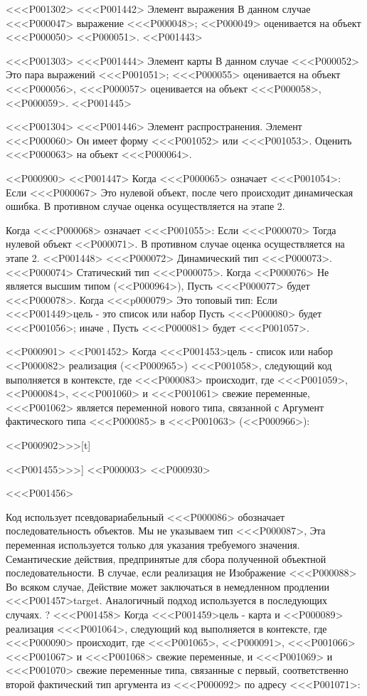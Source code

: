 {{{{{<<<P001302>%
<<<P001442> Элемент выражения
В данном случае <<<P000047> выражение <<<P000048>;
<<P000049> оценивается на объект <<<P000050>
<<P000051>.
<<P001443>

<<<P001303>%
<<<P001444> Элемент карты
В данном случае <<<P000052> Это пара выражений
<<<P001051>;
<<<P000055> оценивается на объект <<<P000056>,
<<<P000057> оценивается на объект <<<P000058>,
<<P000059>.
<<P001445>

<<<P001304>%
<<<P001446> Элемент распространения.
Элемент <<<P000060> Он имеет форму <<<P001052> или <<<P001053>.
Оценить <<<P000063> на объект <<<P000064>.

<<P000900>
<<P001447>
Когда <<<P000065> означает <<<P001054>:
Если <<<P000067> Это нулевой объект, после чего происходит динамическая ошибка.
В противном случае оценка осуществляется на этапе 2.

Когда <<<P000068> означает <<<P001055>:
Если <<<P000070> Тогда нулевой объект
<<P000071>.
В противном случае оценка осуществляется на этапе 2.
<<P001448>
<<<P000072> Динамический тип <<<P000073>.
<<<P000074> Статический тип <<<P000075>.
Когда <<P000076> Не является высшим типом
(<<P000964>),
Пусть <<<P000077> будет <<<P000078>.
Когда <<<p000079> Это топовый тип:
Если <<<P001449>{цель} - это список или набор
Пусть <<<P000080> будет <<<P001056>;
иначе
,
Пусть <<<P000081> будет <<<P001057>.

<<P000901>
<<P001452>
Когда <<<P001453>{цель} - список или набор
<<P000082> реализация
(<<P000965>)
<<<P001058>,
следующий код выполняется в контексте, где <<<P000083> происходит,
где <<<P001059>, <<P000084>, <<<P001060> и <<<P001061> свежие переменные,<<<P001062> является переменной нового типа, связанной с
Аргумент фактического типа <<<P000085> в <<<P001063>
(<<P000966>):

\vspace{-2ex}<<P000902>>>[t]{<<P001455>>>]
<<P000003>
<<P000930>

<<<P001456>{%
Код использует псевдовариабельный <<<P000086> обозначает последовательность объектов.
Мы не указываем тип <<<P000087>,
Эта переменная используется только для указания требуемого значения.
Семантические действия, предпринятые для сбора полученной объектной последовательности.
В случае, если реализация не
Изображение <<<P000088> Во всяком случае,
Действие может заключаться в немедленном продлении <<<P001457>{target}.
Аналогичный подход используется в последующих случаях.%
?
<<<P001458>
Когда <<<P001459>{цель} - карта и <<P000089> реализация
<<<P001064>,
следующий код выполняется в контексте, где <<<P000090> происходит,
где <<<P001065>, <<P000091>, <<<P001066> <<<P001067> и <<<P001068>
свежие переменные,
и <<<P001069> и <<<P001070> свежие переменные типа, связанные с
первый, соответственно второй фактический тип аргумента
из <<<P000092> по адресу <<<P001071>:

}}}}}}}

